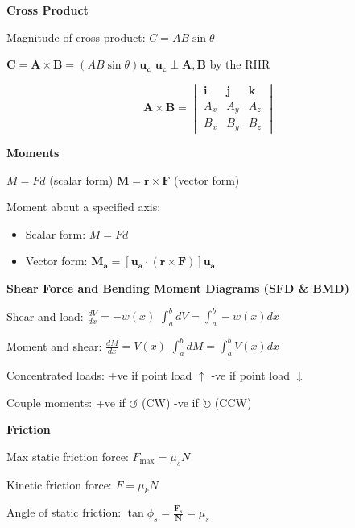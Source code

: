 \documentclass[twocolumn]{article}
\begin{document}
\dotfill

\textbf{Cross Product}

Magnitude of cross product: $C = AB \sin \theta$

$\mathbf{C} = \mathbf{A} \times \mathbf{B} = (AB \sin \theta) \mathbf{u_c}$ \hfill $\mathbf{u_c} \perp \mathbf{A}, \mathbf{B}$ by the RHR

\begin{equation*}
    \mathbf{A} \times \mathbf{B} =
    \begin{vmatrix}
        \mathbf{i} & \mathbf{j} & \mathbf{k} \\
        A_x & A_y & A_z \\
        B_x & B_y & B_z
    \end{vmatrix}
\end{equation*}

\dotfill

\textbf{Moments}

$M = Fd$ (scalar form) \hfill $\mathbf{M} = \mathbf{r} \times \mathbf{F}$ (vector form)

Moment about a specified axis:
\begin{itemize}
    \item Scalar form: $M = F d$
    \item Vector form: $\mathbf{M_a} = [ \mathbf{u_a} \cdot (\mathbf{r} \times \mathbf{F})] \mathbf{u_a}$
\end{itemize}

\dotfill

\textbf{Shear Force and Bending Moment Diagrams (SFD \& BMD)}

Shear and load: $\frac{dV}{dx} = - w(x)$ \hfill $\displaystyle\int_a^b dV = \int_a^b -w(x) dx$

Moment and shear: $\frac{dM}{dx} = V(x)$ \hfill $\displaystyle\int_a^b dM = \int_a^b V(x) dx$

Concentrated loads: +ve if point load $\uparrow$ \hfill -ve if point load $\downarrow$

Couple moments: +ve if $\circlearrowleft$ (CW) \hfill -ve if $\circlearrowright$ (CCW)

\newpage

\textbf{Friction}

Max static friction force: $F_{\text{max}} = \mu_s N$

Kinetic friction force: $F = \mu_k N$

Angle of static friction: $\tan \phi_s = \frac{\mathbf{F}_s}{\mathbf{N}} = \mu_s$

\dotfill
\end{document}
